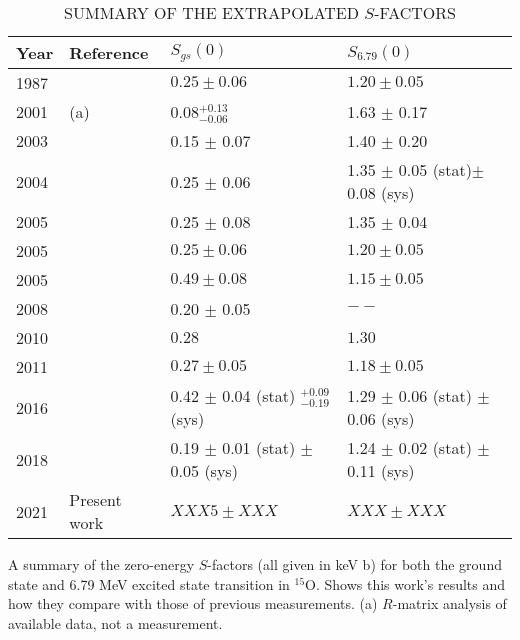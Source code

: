 \begin{sidewaystable*}[]
\caption{SUMMARY OF THE EXTRAPOLATED $S$-FACTORS}
\begin{center}
\begin{threeparttable}
\begin{tabular}{llll}
\toprule
Year & Reference & $S_{gs}(0)$       & $S_{6.79}(0)$ \\
\midrule
1987 & \citet{Schroder1987}   & $0.25 \pm 0.06$ & $1.20 \pm 0.05$  \\
2001 & \citet{Angulo2001}  (a) & 0.08$^{+0.13}_{-0.06}$  & 1.63 $\pm$ 0.17 \\
2003 & \citet{Mukhamedzhanov2003} & 0.15 $\pm$ 0.07 & 1.40 $\pm$ 0.20 \\
2004 & \citet{Formicola2004}  & 0.25 $\pm$ 0.06 & 1.35 $\pm$ 0.05 (stat)$\pm$ 0.08 (sys) \\
2005 &\citet{Angulo2005}   & 0.25 $\pm$ 0.08  & 1.35 $\pm$ 0.04  \\
2005 & \citet{Imbriani2005}   & $0.25 \pm 0.06$ & $1.20 \pm 0.05$  \\
2005 & \citet{Runkle2005}   & $0.49 \pm 0.08$ & $1.15 \pm 0.05$  \\
2008 & \citet{Marta2008}  & 0.20 $\pm$ 0.05   & $--$ \\
2010 & \citet{Azuma2010}   & $0.28$ & $1.30$  \\
2011 & \citet{Adelberger2011}   & $0.27 \pm 0.05$ & $1.18 \pm 0.05$  \\
2016 & \citet{Li2016}   & 0.42 $\pm$ 0.04 (stat)  $^{+0.09}_{-0.19}$(sys) & 1.29 $\pm$ 0.06 (stat) $\pm$ 0.06 (sys)  \\
2018 & \citet{Wagner2018}   & 0.19 $\pm$ 0.01 (stat) $\pm$ 0.05 (sys) & 1.24 $\pm$ 0.02 (stat) $\pm$ 0.11 (sys)  \\ 
2021 & Present work  & $XXX5 \pm XXX$ & $XXX \pm XXX$  \\
\bottomrule
\end{tabular}
\begin{tablenotes}
\small 
\item A summary of the zero-energy $S$-factors (all given in keV b) for both the ground state and 6.79 MeV excited state transition in $^{15}$O. Shows this work's results and how they compare with those of previous measurements.  (a) $R$-matrix analysis of available data, not a measurement.
\end{tablenotes}
\end{threeparttable}
\label{table: sfactorSummary}
\end{center}
\end{sidewaystable*}



